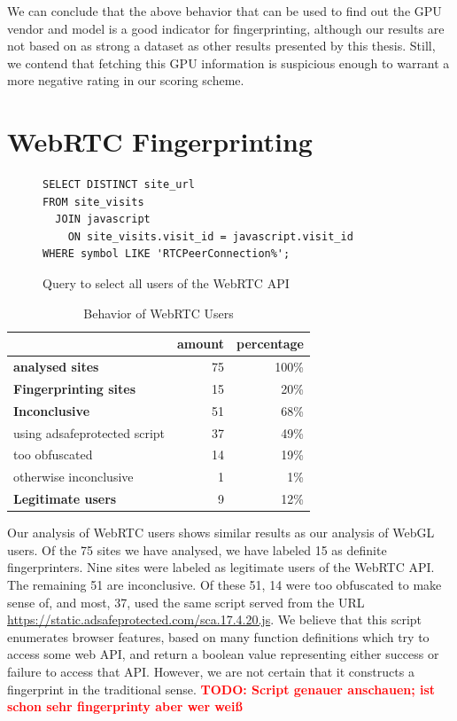 \documentclass[
    fontsize=12pt,
    headings=small,
    parskip=half,
    bibliography=totoc,
    numbers=noenddot,
    open=any
    ]{scrreprt}
\newcommand{\todo}[1]{\textcolor{red}{\textbf{TODO: #1}}}
\begin{document}
We can conclude that the above behavior that can be used to find out the GPU vendor and model
is a good indicator for fingerprinting, although our results are not based on as strong a dataset
as other results presented by this thesis. Still, we contend that fetching this GPU information
is suspicious enough to warrant a more negative rating in our scoring scheme.


\section{WebRTC Fingerprinting}
\begin{figure}
\begin{verbatim}
SELECT DISTINCT site_url
FROM site_visits
  JOIN javascript
    ON site_visits.visit_id = javascript.visit_id
WHERE symbol LIKE 'RTCPeerConnection%';
\end{verbatim}
\caption{Query to select all users of the WebRTC API}
\label{code:webrtc_query}
\end{figure}

\begin{table}
\centering
\caption{Behavior of WebRTC Users}
\begin{tabular}{l r r}
    \toprule
    & amount & percentage \\
    \midrule
    \textbf{analysed sites} & 75 & 100\% \\
    \midrule
    \textbf{Fingerprinting sites} & 15 & 20\% \\
    \midrule
    \textbf{Inconclusive} & 51 & 68\% \\
    using adsafeprotected script & 37 & 49\% \\
    too obfuscated & 14 & 19\% \\
    otherwise inconclusive & 1 & 1\% \\
    \midrule
    \textbf{Legitimate users} & 9 & 12\% \\
    \bottomrule
\end{tabular}
\label{table:webrtc_users}
\end{table}

Our analysis of WebRTC users shows similar results as our analysis of WebGL users.
Of the 75 sites we have analysed, we have labeled 15 as definite fingerprinters.
Nine sites were labeled as legitimate users of the WebRTC API. The remaining 51 are inconclusive.
Of these 51, 14 were too obfuscated to make sense of, and most, 37, used the same script
served from the URL \url{https://static.adsafeprotected.com/sca.17.4.20.js}.
We believe that this script enumerates browser features, based on many function definitions
which try to access some web API, and return a boolean value representing either success
or failure to access that API.
However, we are not certain that it constructs a fingerprint in the traditional sense.
\todo{Script genauer anschauen; ist schon sehr fingerprinty aber wer weiß}
\end{document}

